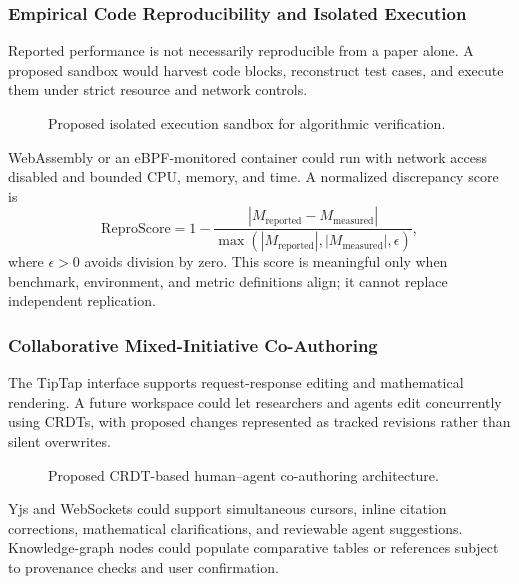 \documentclass[conference]{IEEEtran}
\begin{document}
\subsubsection{Empirical Code Reproducibility and Isolated Execution}
Reported performance is not necessarily reproducible from a paper alone. A proposed sandbox would harvest code blocks, reconstruct test cases, and execute them under strict resource and network controls.
\begin{figure}[t]\centering{}\caption{Proposed isolated execution sandbox for algorithmic verification.}\label{fig:sandbox}\end{figure}
WebAssembly or an eBPF-monitored container could run with network access disabled and bounded CPU, memory, and time. A normalized discrepancy score is
\begin{equation}\mathrm{ReproScore}=1-\frac{|M_{\mathrm{reported}}-M_{\mathrm{measured}}|}{\max(|M_{\mathrm{reported}}|,|M_{\mathrm{measured}}|,\epsilon)},\end{equation}
where $\epsilon>0$ avoids division by zero. This score is meaningful only when benchmark, environment, and metric definitions align; it cannot replace independent replication.
\subsubsection{Collaborative Mixed-Initiative Co-Authoring}
The TipTap interface supports request-response editing and mathematical rendering. A future workspace could let researchers and agents edit concurrently using CRDTs, with proposed changes represented as tracked revisions rather than silent overwrites.
\begin{figure}[t]\centering{}\caption{Proposed CRDT-based human--agent co-authoring architecture.}\label{fig:crdt}\end{figure}
Yjs and WebSockets could support simultaneous cursors, inline citation corrections, mathematical clarifications, and reviewable agent suggestions. Knowledge-graph nodes could populate comparative tables or references subject to provenance checks and user confirmation.
\end{document}
